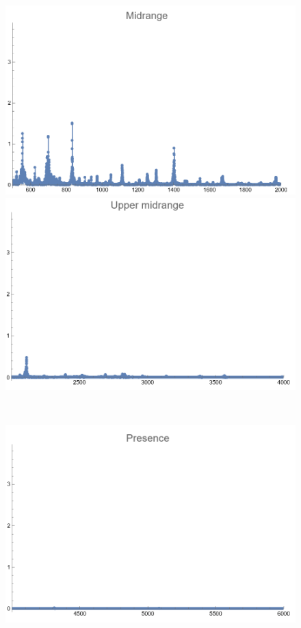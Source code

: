 \documentclass[12pt, letterpaper]{article}
\begin{document}
\begin{figure}[H]
\begin{minipage}{.3\textwidth}
  \end{minipage}
  \begin{minipage}{0.03\textwidth}\end{minipage}
  \begin{minipage}{.3\textwidth}
    \centering
    \includegraphics[width=.9\linewidth]{imgs/Cancion4/mid.png}
  \end{minipage}
  \begin{minipage}{0.03\textwidth}\end{minipage}
  \begin{minipage}{.3\textwidth}
    \centering
    \includegraphics[width=.9\linewidth]{imgs/Cancion4/upmid.png}
  \end{minipage} \medskip \\
  \begin{minipage}{.3\textwidth}
    \centering
    \includegraphics[width=.9\linewidth]{imgs/Cancion4/presence.png}

\end{minipage}
\end{figure}
\end{document}
